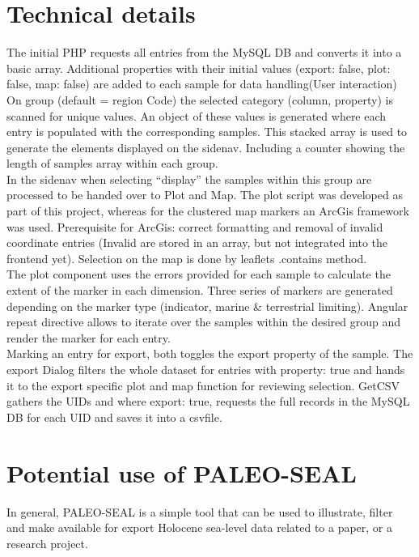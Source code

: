 \documentclass[a4paper,fleqn]{cas-dc}
\begin{document}
\section{Technical details}
The initial PHP requests all entries from the MySQL DB and converts it into a basic array.  Additional properties with their initial values (export: false, plot: false, map: false) are added to each sample for data handling(User interaction)
On group (default = region Code) the selected category (column, property) is scanned for unique values. An object of these values is generated where each entry is populated with the corresponding samples. This stacked array is used to generate the elements displayed on the sidenav. Including a counter showing the length of samples array within each group. \\
In the sidenav when selecting “display” the samples within this group are processed to be handed over to Plot and Map. The plot script was developed as part of this project, whereas for the clustered map markers an ArcGis framework was used. Prerequisite for ArcGis: correct formatting and removal of invalid coordinate entries (Invalid are stored in an array, but not integrated into the frontend yet). Selection on the map is done by leaflets .contains method. \\ 
The plot component uses the errors provided for each sample to calculate the extent of the marker in each dimension. Three series of markers are generated depending on the marker type (indicator, marine \& terrestrial limiting). Angular repeat directive allows to iterate over the samples within the desired group and render the marker for each entry. \\
Marking an entry for export, both toggles the export property of the sample. The export Dialog filters the whole dataset for entries with property: true and hands it to the export specific plot and map function for reviewing selection. GetCSV gathers the UIDs and where export: true, requests the full records in the MySQL DB for each UID and saves it into a csvfile.


\section{Potential use of PALEO-SEAL}
In general, PALEO-SEAL is a simple tool that can be used to illustrate, filter and make available for export Holocene sea-level data related to a paper, or a research project.   

\printcredits

%



\end{document}
